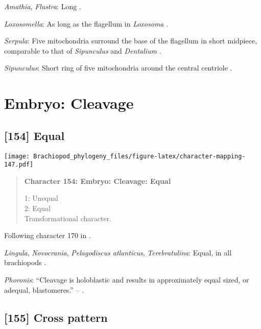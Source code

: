 \documentclass[openany]{book}
\theoremstyle{definition}
\theoremstyle{definition}
\theoremstyle{definition}
\theoremstyle{remark}
\begin{document}
\hypertarget{Amathia-coding-153}{}
\emph{Amathia}, \emph{Flustra}: Long \citep{Franzen1981}.

\hypertarget{Loxosomella-coding-153}{}
\emph{Loxosomella}: As long as the flagellum in \emph{Loxosoma}
\citep{Franzen2000}.

\hypertarget{Serpula-coding-153}{}
\emph{Serpula}: Five mitochondria surround the base of the flagellum in
short midpiece, comparable to that of \emph{Sipunculus} and
\emph{Dentalium} \citep{Gherardi2011}.

\hypertarget{Sipunculus-coding-153}{}
\emph{Sipunculus}: Short ring of five mitochondria around the central
centriole \citep{Rice1993}.

\section{Embryo: Cleavage}\label{embryo-cleavage}

\subsection*{{[}154{]} Equal}\label{equal}

\texttt{[image: Brachiopod\_phylogeny\_files/figure-latex/character-mapping-147.pdf]}

\begin{quote}
\textbf{Character 154: Embryo: Cleavage: Equal}

1: Unequal\\
2: Equal\\
Transformational character.
\end{quote}

Following character 170 in \citet{Giribet2002}.

\hypertarget{Lingula-coding-154}{}
\emph{Lingula}, \emph{Novocrania}, \emph{Pelagodiscus atlanticus},
\emph{Terebratulina}: Equal, in all brachiopods
\citep{Williams1997Introduction}.

\hypertarget{Phoronis-coding-154}{}
\emph{Phoronis}: ``Cleavage is holoblastic and results in approximately
equal sized, or adequal, blastomeres.'' -- \citet{Pennerstorfer2012}.

\subsection*{{[}155{]} Cross pattern}\label{cross-pattern}
\end{document}
